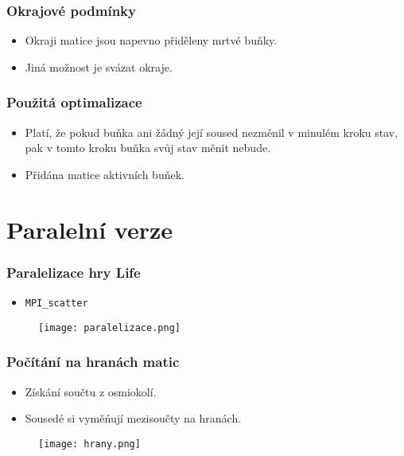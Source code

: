 \documentclass{beamer}
\begin{document}
\begin{frame}
\frametitle{Okrajové podmínky}
    \begin{itemize}
          \item Okraji matice jsou napevno přiděleny mrtvé buňky.
          \item Jiná možnost je svázat okraje.
    \end{itemize}
\end{frame}


\begin{frame}
\frametitle{Použitá optimalizace}
   \begin{itemize}
      \item Platí, že pokud buňka ani žádný její soused nezměnil v minulém kroku stav,
pak v tomto kroku buňka svůj stav měnit nebude.
      \item Přidána matice aktivních buňek.
   \end{itemize}
\end{frame}

\section{Paralelní verze}

\begin{frame}
\frametitle{Paralelizace hry Life}
\begin{itemize}
  \item \texttt{MPI\_scatter}
\end{itemize}
\begin{figure}
    \centering
    \texttt{[image: paralelizace.png]}
\end{figure}
\end{frame}


\begin{frame}
\frametitle{Počítání na hranách matic}
\begin{itemize}
  \item Získání součtu z osmiokolí.
  \item Sousedé si vyměńují mezisoučty na hranách.
\end{itemize}
\begin{figure}
    \centering
    \texttt{[image: hrany.png]}
\end{figure}
\end{frame}
\end{document}

